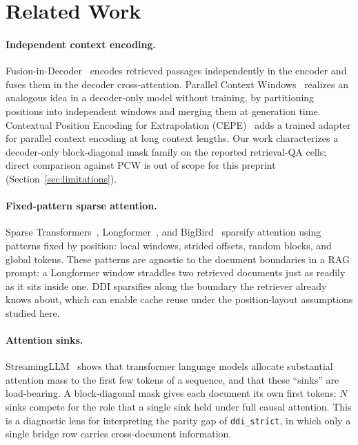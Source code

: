 \section{Related Work}
\label{sec:related}

\paragraph{Independent context encoding.}
Fusion-in-Decoder~\citep{izacard2021fid} encodes retrieved passages
independently in the encoder and fuses them in the decoder cross-attention.
Parallel Context Windows~\citep{ratner2023pcw} realizes an analogous idea in
a decoder-only model without training, by partitioning positions into
independent windows and merging them at generation time. Contextual Position
Encoding for Extrapolation (CEPE)~\citep{yen2024cepe} adds a trained adapter
for parallel context encoding at long context lengths. Our work characterizes
a decoder-only block-diagonal mask family on the reported retrieval-QA cells;
direct comparison against PCW is out of scope for this preprint
(Section~\ref{sec:limitations}).

\paragraph{Fixed-pattern sparse attention.}
Sparse Transformers~\citep{child2019sparse},
Longformer~\citep{beltagy2020longformer}, and
BigBird~\citep{zaheer2020bigbird} sparsify attention using patterns fixed by
position: local windows, strided offsets, random blocks, and global tokens.
These patterns are agnostic to the document boundaries in a RAG prompt: a
Longformer window straddles two retrieved documents just as readily as it
sits inside one. DDI sparsifies along the boundary the retriever already knows
about, which can enable cache reuse under the position-layout assumptions
studied here.

\paragraph{Attention sinks.}
StreamingLLM~\citep{xiao2024streamingllm} shows that transformer language
models allocate substantial attention mass to the first few tokens of a
sequence, and that these ``sinks'' are load-bearing. A block-diagonal mask
gives each document its own first tokens: $N$ sinks compete for the role
that a single sink held under full causal attention. This is a diagnostic
lens for interpreting the parity gap of \texttt{ddi\_strict}, in which
only a single bridge row carries cross-document information.

